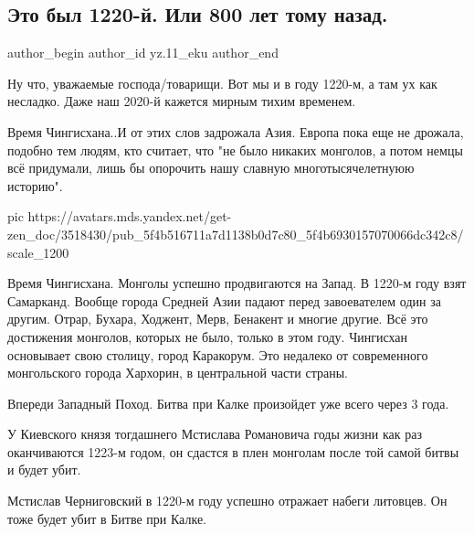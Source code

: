  
 
 
 
 
 
\subsection{Это был 1220-й. Или 800 лет тому назад.}
\label{sec:07_09_2020.sites.ru.zen_yandex.yz.11_eku.1.god_1220_800_let_nazad}
\ifcmt
	author_begin
   author_id yz.11_eku
	author_end
\fi

Ну что, уважаемые господа/товарищи. Вот мы и в году 1220-м, а там ух как
несладко. Даже наш 2020-й кажется мирным тихим временем.

Время Чингисхана..И от этих слов задрожала Азия. Европа пока еще не дрожала,
подобно тем людям, кто считает, что "не было никаких монголов, а потом немцы
всё придумали, лишь бы опорочить нашу славную многотысячелетнуюю историю".

\ifcmt
pic https://avatars.mds.yandex.net/get-zen_doc/3518430/pub_5f4b516711a7d1138b0d7c80_5f4b6930157070066dc342c8/scale_1200
\fi

Время Чингисхана. Монголы успешно продвигаются на Запад. В 1220-м году взят
Самарканд. Вообще города Средней Азии падают перед завоевателем один за другим.
Отрар, Бухара, Ходжент, Мерв, Бенакент и многие другие. Всё это достижения
монголов, которых не было, только в этом году. Чингисхан основывает свою
столицу, город Каракорум. Это недалеко от современного монгольского города
Хархорин, в центральной части страны.

Впереди Западный Поход. Битва при Калке произойдет уже всего через 3 года.

У Киевского князя тогдашнего Мстислава Романовича годы жизни как раз
оканчиваются 1223-м годом, он сдастся в плен монголам после той самой битвы и
будет убит.

Мстислав Черниговский в 1220-м году успешно отражает набеги литовцев. Он тоже
будет убит в Битве при Калке.

